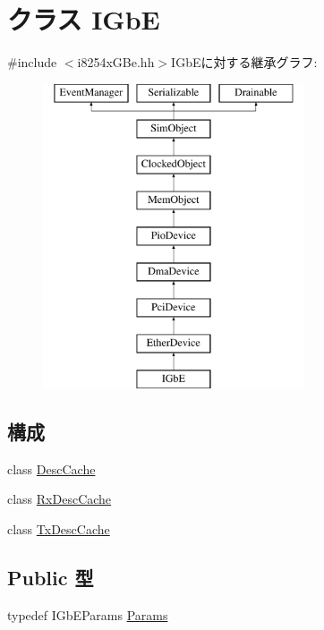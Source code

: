 \hypertarget{classIGbE}{
\section{クラス IGbE}
\label{classIGbE}
}


{\ttfamily \#include $<$i8254xGBe.hh$>$}IGbEに対する継承グラフ:\begin{figure}[H]
\begin{center}
\leavevmode
\includegraphics[height=9cm]{classIGbE}
\end{center}
\end{figure}
\subsection*{構成}
\begin{DoxyCompactItemize}
\item 
class \hyperlink{classIGbE_1_1DescCache}{DescCache}
\item 
class \hyperlink{classIGbE_1_1RxDescCache}{RxDescCache}
\item 
class \hyperlink{classIGbE_1_1TxDescCache}{TxDescCache}
\end{DoxyCompactItemize}
\subsection*{Public 型}
\begin{DoxyCompactItemize}
\item 
typedef IGbEParams \hyperlink{classIGbE_ad27b5cfed87f35a483863a73336d8258}{Params}
\end{DoxyCompactItemize}
